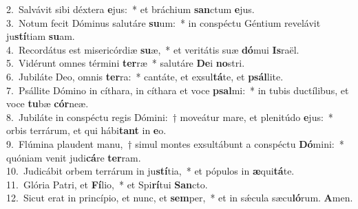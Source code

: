 {2.~}Salvávit sibi déxtera \textbf{e}jus:~* et bráchium \textbf{san}ctum \textbf{e}jus.\\
{3.~}Notum fecit Dóminus salutáre \textbf{su}um:~* in conspéctu Géntium revelávit ju\textbf{stí}tiam \textbf{su}am.\\
{4.~}Recordátus est misericórdiæ \textbf{su}æ,~* et veritátis suæ \textbf{dó}mui \textbf{Is}raël.\\
{5.~}Vidérunt omnes términi \textbf{ter}ræ~* salutáre \textbf{De}i \textbf{no}stri.\\
{6.~}Jubiláte Deo, omnis \textbf{ter}ra:~* cantáte, et exsul\textbf{tá}te, et \textbf{psál}lite.\\
{7.~}Psállite Dómino in cíthara, in cíthara et voce \textbf{psal}mi:~* in tubis ductílibus, et voce \textbf{tu}bæ \textbf{cór}neæ.\\
{8.~}Jubiláte in conspéctu regis Dómini:~† moveátur mare, et plenitúdo \textbf{e}jus:~* orbis terrárum, et qui hábi\textbf{tant} in \textbf{e}o.\\
{9.~}Flúmina plaudent manu,~† simul montes exsultábunt a conspéctu \textbf{Dó}mini:~* quóniam venit judi\textbf{cá}re \textbf{ter}ram.\\
{10.~}Judicábit orbem terrárum in ju\textbf{stí}tia,~* et pópulos in \textbf{æ}qui\textbf{tá}te.\\
{11.~}Glória Patri, et \textbf{Fí}lio,~* et Spi\textbf{rí}tui \textbf{San}cto.\\
{12.~}Sicut erat in princípio, et nunc, et \textbf{sem}per,~* et in sǽcula sæcu\textbf{ló}rum. \textbf{A}men.\\
